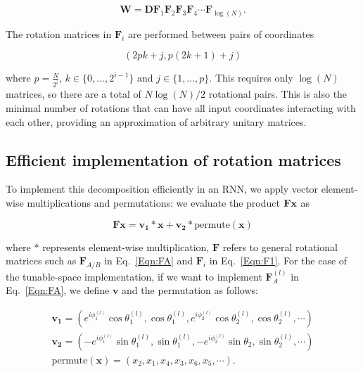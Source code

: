 \begin{equation}
\mathbf{W} = \mathbf{D}\mathbf{F}_1\mathbf{F}_2\mathbf{F}_3\mathbf{F}_4\cdots\mathbf{F}_{\log(N)}.
\label{Eqn:F1}
\end{equation}

The rotation matrices in $\mathbf{F}_i$ are performed between pairs of coordinates

\begin{equation}
(2pk + j, p(2k+1) + j)
\end{equation}

 
where $p=\frac{N}{2^i}$, $k\in\{0,...,2^{i-1}\}$ and $j\in\{1,...,p\}$. This requires only  $\log(N)$ matrices, so there are a total of $N\log(N)/2$ rotational pairs. This is also the minimal number of rotations that can have all input coordinates interacting with each other, providing an approximation of arbitrary unitary matrices.

\subsection{Efficient implementation of rotation matrices}

To implement this decomposition efficiently in an RNN, we apply vector element-wise multiplications and permutations: we evaluate the product $\mathbf{F}{\bf x}$ as

\begin{equation}
\mathbf{F}\mathbf{x}= \mathbf{v_1}*\mathbf{x} +\mathbf{v_2} * \mathrm{permute}(\mathbf{x})
\end{equation}

where $*$ represents element-wise multiplication, $\mathbf{F}$ refers to general rotational matrices such as $\mathbf{F}_{A/B}$ in Eq.~\ref{Eqn:FA} and $\mathbf{F}_i$ in Eq.~\ref{Eqn:F1}. For the case of the tunable-space implementation, if we want to implement $\mathbf{F}_A^{(l)}$ in Eq.~\ref{Eqn:FA}, we define $\mathbf{v}$ and the permutation as follows:

\begin{eqnarray*}
\mathbf{v_1} = (e^{i\phi_1^{(l)}}\cos\theta_1^{(l)}, \cos\theta_1^{(l)}, e^{i\phi_2^{(l)}}\cos\theta_2^{(l)}, \cos\theta_2^{(l)}, \cdots)\\
\mathbf{v_2} = (-e^{i\phi_1^{(l)}}\sin\theta_1^{(l)}, \sin\theta_1^{(l)}, -e^{i\phi_2^{(l)}}\sin\theta_2, \sin\theta_2^{(l)}, \cdots)\\
\mathrm{permute}(\mathbf{x}) = (x_2, x_1, x_4, x_3, x_6, x_5, \cdots).
\end{eqnarray*}

